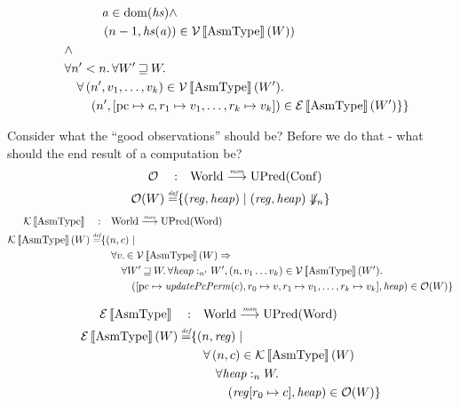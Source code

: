 \documentclass{article}
\newcommand{\update}[2]{[#1 \mapsto #2]}%
\newcommand{\sem}[1]{\left\llbracket #1 \right\rrbracket}
\newcommand{\monfun}{\stackrel{\textit{\tiny{mon}}}{\longrightarrow}}
\newcommand{\defeq}{\stackrel{\textit{\tiny{def}}}{=}}
\DeclareMathOperator{\dom}{dom}
\newcommand{\var}[1]{\mathit{#1}}
\newcommand{\pcreg}{\mathrm{pc}}
\newcommand{\addr}{\var{a}}
\newcommand{\reg}{\var{reg}}
\newcommand{\heapseg}{\var{hs}}
\newcommand{\heap}{\var{heap}}
\newcommand{\plainfun}[1]{\mathit{#1}}
\newcommand{\updatePcPerm}[1]{\plainfun{updatePcPerm}(#1)}
\newcommand{\future}{\mathbin{\sqsupseteq}}
\newcommand{\heapSat}[3][\heap]{#1 :_{#2} #3}
\newcommand{\asmType}{\plaindom{AsmType}}
\newcommand{\plaindom}[1]{\mathrm{#1}}
\newcommand{\Words}{\plaindom{Word}}
\newcommand{\Confs}{\plaindom{Conf}}
\newcommand{\Worlds}{\plaindom{World}}
\newcommand{\UPred}[1]{\plaindom{UPred}(#1)}
\newcommand{\intr}[2]{\mathcal{#1}\sem{#2}}
\newcommand{\valueintr}[1]{\intr{V}{#1}}
\newcommand{\exprintr}[1]{\intr{E}{#1}}
\newcommand{\contintr}[1]{\intr{K}{#1}}
\newcommand{\stdvr}{\valueintr{\asmType}}
\newcommand{\stder}{\exprintr{\asmType}}
\newcommand{\stdkr}{\contintr{\asmType}}
\newcommand{\observations}{\mathcal{O}}
\newcommand{\npair}[2][n]{\left(#1,#2 \right)}
\newcommand{\diverge}[1][n]{\not\Downarrow_{#1}}
\begin{document}
\begin{align*}
                   & \qquad \qquad   \addr \in \dom(\heapseg) \land \\
                   & \qquad \qquad   \npair[n-1]{\heapseg(\addr)} \in \stdvr(W)) \\
                   & \quad \land \\
                   & \quad \forall n' < n \ldotp \forall W' \future W \ldotp \\
                   & \qquad \forall \npair[n']{v_1,\dots,v_k} \in \stdvr(W') \ldotp \\
                   & \qquad \quad \npair[n']{[\pcreg \mapsto c, r_1 \mapsto v_1, \dots , r_k \mapsto v_k]} \in \stder(W') \}
\}
\end{align*}

Consider what the ``good observations'' should be? Before we do that - what should the end result of a computation be?
\begin{align*}
  \observations \quad : & \quad  \Worlds \monfun \UPred{\Confs} \\%
  \observations (W) \defeq & \{ (\reg,\heap) \mid (\reg,\heap) \diverge \}
\end{align*}
\begin{align*}
  \stdkr \quad : & \quad  \Worlds \monfun \UPred{\Words} \\%
  \stdkr(W) \defeq & \{ \npair{c} \mid \\
                   & \quad \forall v\ldotp \in \stdvr(W) \Rightarrow \\
                   & \qquad  \forall W' \future W\ldotp %
                     \forall \heapSat[\heap]{n'}{W'}, \npair{v_1 \dots v_k} \in \stdvr(W') \ldotp \\
                   & \qquad \quad ([\pcreg \mapsto \updatePcPerm{c},r_0 \mapsto v,r_1 \mapsto v_1,\dots, r_k \mapsto v_k], \heap) \in \observations(W) \}
\end{align*}

\begin{align*}
  \stder \quad : & \quad \Worlds \monfun \UPred{\Words} \\%
  \stder(W) \defeq & \{ \npair{\reg} \mid \\
                   & \quad \forall \npair{c} \in \stdkr(W) \\
                   & \qquad  \forall \heapSat[\heap]{n}{W} \ldotp \\
                   & \qquad \quad (\reg\update{r_0}{c},\heap) \in \observations(W) \}
\end{align*}
\end{document}
